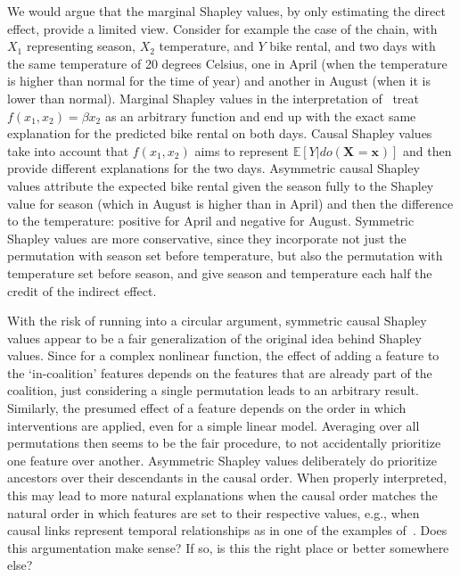 \documentclass{article}
\newcommand{\vX}{\mathbf{X}}
\newcommand{\vx}{\mathbf{x}}
\newcommand{\expectation}{\mathbb{E}}
\newcommand{\dodo}{\mathit{do}}
\newcommand{\lvdo}[1]{\dodo(\vX_{#1} = \vx_{#1})}
\newcommand{\comment}[1]{{\color{red} #1}}
\begin{document}
We would argue that the marginal Shapley values, by only estimating the direct effect, provide a limited view. Consider for example the case of the chain, with $X_1$ representing season, $X_2$ temperature, and $Y$ bike rental, and two days with the same temperature of 20 degrees Celsius, one in April (when the temperature is higher than normal for the time of year) and another in August (when it is lower than normal). Marginal Shapley values in the interpretation of~\cite{janzing2019feature,lundberg2020local} treat $f(x_1,x_2) = \beta x_2$ as an arbitrary function and end up with the exact same explanation for the predicted bike rental on both days. Causal Shapley values take into account that $f(x_1,x_2)$ aims to represent $\expectation[Y|\lvdo{}]$ and then provide different explanations for the two days. Asymmetric causal Shapley values attribute the expected bike rental given the season fully to the Shapley value for season (which in August is higher than in April) and then the difference to the temperature: positive for April and negative for August. Symmetric Shapley values are more conservative, since they incorporate not just the permutation with season set before temperature, but also the permutation with temperature set before season, and give season and temperature each half the credit of the indirect effect.

With the risk of running into a circular argument, symmetric causal Shapley values appear to be a fair generalization of the original idea behind Shapley values. Since for a complex nonlinear function, the effect of adding a feature to the `in-coalition' features depends on the features that are already part of the coalition, just considering a single permutation leads to an arbitrary result. Similarly, the presumed effect of a feature depends on the order in which interventions are applied, even for a simple linear model. Averaging over all permutations then seems to be the fair procedure, to not accidentally prioritize one feature over another. Asymmetric Shapley values deliberately do prioritize ancestors over their descendants in the causal order. When properly interpreted, this may lead to more natural explanations when the causal order matches the natural order in which features are set to their respective values, e.g., when causal links represent temporal relationships as in one of the examples of~\cite{frye2019asymmetric}.\comment{Does this argumentation make sense? If so, is this the right place or better somewhere else?}
\end{document}
